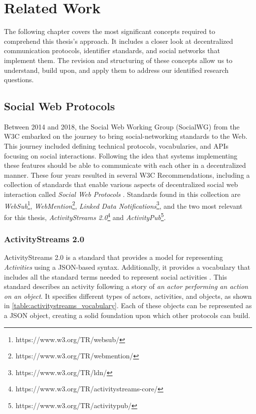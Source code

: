 \chapter{Related Work}
\label{cha:relatedwork}

The following chapter covers the most significant concepts required to comprehend this thesis's approach. It includes a closer look at decentralized communication protocols, identifier standards, and social networks that implement them. The revision and structuring of these concepts allow us to understand, build upon, and apply them to address our identified research questions.

\section{Social Web Protocols}
Between 2014 and 2018, the Social Web Working Group (SocialWG) from the W3C embarked on the journey to bring social-networking standards to the Web. This journey included defining technical protocols, vocabularies, and APIs focusing on social interactions. Following the idea that systems implementing these features should be able to communicate with each other in a decentralized manner. These four years resulted in several W3C Recommendations, including a collection of standards that enable various aspects of decentralized social web interaction called \emph{Social Web Protocols} \cite{celik_prodromou_le_hors_2014}. Standards found in this collection are \emph{WebSub}\footnote{https://www.w3.org/TR/websub/}, \emph{WebMention}\footnote{https://www.w3.org/TR/webmention/}, \emph{Linked Data Notifications}\footnote{https://www.w3.org/TR/ldn/}, and the two most relevant for this thesis, \emph{ActivityStreams 2.0}\footnote{https://www.w3.org/TR/activitystreams-core/} and \emph{ActivityPub}\footnote{https://www.w3.org/TR/activitypub/}.

\subsection{ActivityStreams 2.0}\label{subsec:activitystreams}


ActivityStreams 2.0 is a standard that provides a model for representing \emph{Activities} using a JSON-based syntax. Additionally, it provides a vocabulary that includes all the standard terms needed to represent social activities \cite{snell_prodromou_2017}. This standard describes an activity following a story of \emph{an actor performing an action on an object}. It specifies different types of actors, activities, and objects, as shown in \autoref{table:activitystreams_vocabulary}. Each of these objects can be represented as a JSON object, creating a solid foundation upon which other protocols can build. 

